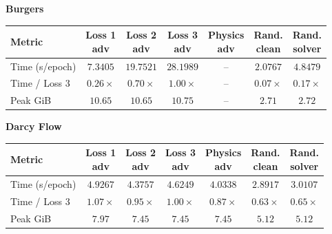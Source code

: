 \clearpage
\begin{center}
\footnotesize
{}
\label{tab:training_epoch_time_comparison}
\setlength{\tabcolsep}{2.2pt}
\renewcommand{\arraystretch}{1.14}
\textbf{Burgers}\par\smallskip
\begin{tabular*}{\textwidth}{@{\extracolsep{\fill}}lcccccc@{}}
\toprule
Metric & \shortstack{Loss 1\\adv} & \shortstack{Loss 2\\adv} &
\shortstack{Loss 3\\adv} & \shortstack{Physics\\adv} &
\shortstack{Rand.\\clean} & \shortstack{Rand.\\solver} \\
\midrule
Time (s/epoch) & $7.3405$ & $19.7521$ & $28.1989$ & -- & $2.0767$ & $4.8479$ \\
Time / Loss 3 & $0.26{\times}$ & $0.70{\times}$ & $1.00{\times}$ & -- & $0.07{\times}$ & $0.17{\times}$ \\
Peak GiB & $10.65$ & $10.65$ & $10.75$ & -- & $2.71$ & $2.72$ \\
\bottomrule
\end{tabular*}

\vspace{0.6em}
\textbf{Darcy Flow}\par\smallskip
\begin{tabular*}{\textwidth}{@{\extracolsep{\fill}}lcccccc@{}}
\toprule
Metric & \shortstack{Loss 1\\adv} & \shortstack{Loss 2\\adv} &
\shortstack{Loss 3\\adv} & \shortstack{Physics\\adv} &
\shortstack{Rand.\\clean} & \shortstack{Rand.\\solver} \\
\midrule
Time (s/epoch) & $4.9267$ & $4.3757$ & $4.6249$ & $4.0338$ & $2.8917$ & $3.0107$ \\
Time / Loss 3 & $1.07{\times}$ & $0.95{\times}$ & $1.00{\times}$ & $0.87{\times}$ & $0.63{\times}$ & $0.65{\times}$ \\
Peak GiB & $7.97$ & $7.45$ & $7.45$ & $7.45$ & $5.12$ & $5.12$ \\
\bottomrule
\end{tabular*}
\end{center}
\vspace{0.7em}

